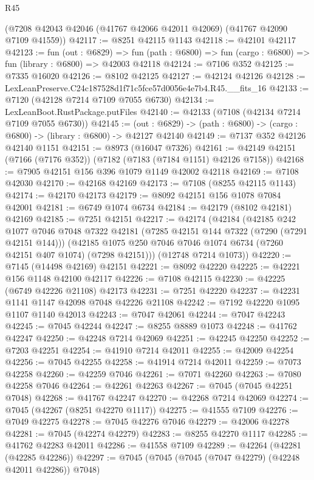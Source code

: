 \begin{lexlean}{R45}
\begin{coremodule}
{    (@7208 @42043 @42046 (@41767 @42066 @42011 @42069) (@41767 @42090 @7109 @41559))
@42117 := @8251 @42115 @1143
@42118 := @42101 @42117
@42123 := fun (out : @6829) =>
  fun (path : @6800) => fun (cargo : @6800) => fun (library : @6800) => @42003 @42118
@42124 := @7106 @352
@42125 := @7335 @16020
@42126 := @8102 @42125
@42127 := @42124 @42126
@42128 := LexLeanPreserve.C24c187528d1f71c5fce57d0056e4e7b4.R45.__fits_16
@42133 := @7120 (@42128 @7214 @7109 @7055 @6730)
@42134 := LexLeanBoot.RustPackage.putFiles
@42140 := @42133 (@7108 (@42134 @7214 @7109 @7055 @6730))
@42145 := (out : @6829) -> (path : @6800) -> (cargo : @6800) -> (library : @6800) -> @42127 @42140
@42149 := @7137 @352 @42126 @42140 @1151
@42151 := @8973 (@16047 @7326)
@42161 := @42149 @42151 (@7166 (@7176 @352)) (@7182 (@7183 (@7184 @1151) @42126 @7158))
@42168 := @7905 @42151 @156 @396 @1079 @1149 @42002 @42118
@42169 := @7108 @42030
@42170 := @42168 @42169
@42173 := @7108 (@8255 @42115 @1143)
@42174 := @42170 @42173
@42179 := @8092 @42151 @156 @1078 @7084 @42001
@42181 := @6749 @1074 @6734
@42184 := @42179 (@8102 @42181) @42169
@42185 := @7251 @42151
@42217 := @42174
    (@42184
      (@42185
        @242
        @1077
        @7046
        @7048
        @7322
        @42181
        (@7285 @42151 @144 @7322 (@7290 (@7291 @42151 @144)))
        (@42185 @1075 @250 @7046 @7046 @1074 @6734 (@7260 @42151 @407 @1074) (@7298 @42151)))
      (@12748 @7214 @1073))
@42220 := @7145 (@14498 @42169) @42151
@42221 := @8092 @42220
@42225 := @42221 @156 @1148 @42100 @42117
@42226 := @7108 @42115
@42230 := @42225 (@6749 @42226 @21108) @42173
@42231 := @7251 @42220
@42237 := @42231 @1141 @1147 @42098 @7048 @42226 @21108
@42242 := @7192 @42220 @1095 @1107 @1140 @42013
@42243 := @7047 @42061
@42244 := @7047 @42243
@42245 := @7045 @42244
@42247 := @8255 @8889 @1073
@42248 := @41762 @42247
@42250 := @42248 @7214 @42069
@42251 := @42245 @42250
@42252 := @7203 @42251
@42254 := @41910 @7214 @42011
@42255 := @42009 @42254
@42256 := @7045 @42255
@42258 := @41914 @7214 @42011
@42259 := @7073 @42258
@42260 := @42259 @7046
@42261 := @7071 @42260
@42263 := @7080 @42258 @7046
@42264 := @42261 @42263
@42267 := @7045 (@7045 @42251 @7048)
@42268 := @41767 @42247
@42270 := @42268 @7214 @42069
@42274 := @7045 (@42267 (@8251 @42270 @1117))
@42275 := @41555 @7109
@42276 := @7049 @42275
@42278 := @7045 @42276 @7046
@42279 := @42006 @42278
@42281 := @7045 (@42274 @42279)
@42283 := @8255 @42270 @1117
@42285 := @41762 @42283 @42011
@42286 := @41558 @7109
@42289 := @42264 (@42281 (@42285 @42286))
@42297 := @7045 (@7045 (@7045 (@7047 @42279) (@42248 @42011 @42286)) @7048)
}
\end{coremodule}
\end{lexlean}
